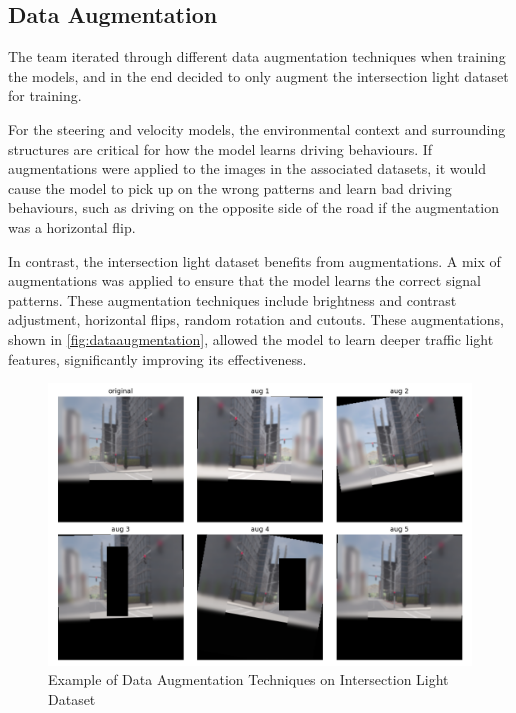 \documentclass{article} %
\begin{document}
\subsection{Data Augmentation}

The team iterated through different data augmentation techniques when training the models, and in the end decided to only augment the intersection light dataset for training.

For the steering and velocity models, the environmental context and surrounding structures are critical for how the model learns driving behaviours. If augmentations were applied to the images in the associated datasets, it would cause the model to pick up on the wrong patterns and learn bad driving behaviours, such as driving on the opposite side of the road if the augmentation was a horizontal flip.

In contrast, the intersection light dataset benefits from augmentations.  A mix of augmentations was applied to ensure that the model learns the correct signal patterns. These augmentation techniques include brightness and contrast adjustment, horizontal flips, random rotation and cutouts. These augmentations, shown in \autoref{fig:dataaugmentation}, allowed the model to learn deeper traffic light features,  significantly improving its effectiveness.

\begin{figure}[H] %
    \centering
    \includegraphics[width=1.0\textwidth]{Data Augmentation.png} %
    \caption{Example of Data Augmentation Techniques on Intersection Light Dataset}
    \label{fig:dataaugmentation}
\end{figure}
\end{document}
